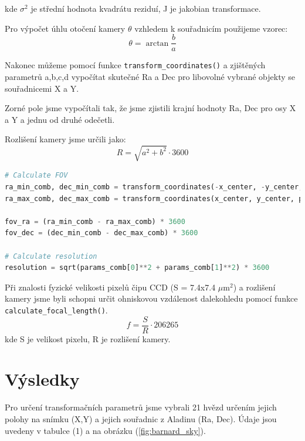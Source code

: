 \documentclass[a4paper,11pt]{article}
\begin{document}
    \begin{minipage}[t]{0.5\textwidth} 
                \par kde $\sigma^2$ je střední hodnota kvadrátu reziduí, J je jakobian transformace.
                \par Pro výpočet úhlu otočení kamery $\theta$ vzhledem k souřadnicím použijeme vzorec: 
                \begin{equation}
                    \theta = \arctan{\frac{b}{a}}
                \end{equation}

                \par Nakonec můžeme pomocí funkce \texttt{transform\_coordinates()} a zjištěných parametrů a,b,c,d vypočítat skutečné Ra a Dec pro libovolné vybrané objekty se souřadnicemi X a Y.

                \par Zorné pole jsme vypočítali tak, že jsme zjistili krajní hodnoty Ra, Dec pro osy X a Y a jednu od druhé odečetli. 
                \par Rozlišení kamery jsme určili jako: 
                \begin{equation}
                    R = \sqrt{a^2 + b^2} \cdot 3600
                \end{equation}

\begin{lstlisting}[language=Python]
# Calculate FOV
ra_min_comb, dec_min_comb = transform_coordinates(-x_center, -y_center, params_comb)
ra_max_comb, dec_max_comb = transform_coordinates(x_center, y_center, params_comb)

fov_ra = (ra_min_comb - ra_max_comb) * 3600
fov_dec = (dec_min_comb - dec_max_comb) * 3600

# Calculate resolution
resolution = sqrt(params_comb[0]**2 + params_comb[1]**2) * 3600
\end{lstlisting}

\par Při znalosti fyzické velikosti pixelů čipu CCD (S = 7.4x7.4 $\mu$m$^2$) a rozlišení kamery jsme byli schopni určit ohniskovou vzdálenost dalekohledu pomocí funkce \texttt{calculate\_focal\_length()}.
\begin{equation}
    f = \frac{S}{R} \cdot 206265
\end{equation}
kde S je velikost pixelu, R je rozlišení kamery. 

        \section{Výsledky}  
                Pro určení transformačních parametrů jsme vybrali 21 hvězd určením jejich polohy na snímku (X,Y) a jejich souřadnic z Aladinu (Ra, Dec). Údaje jsou uvedeny v tabulce (1) a na obrázku (\ref{fig:barnard_sky}).


\end{minipage}
\end{document}
